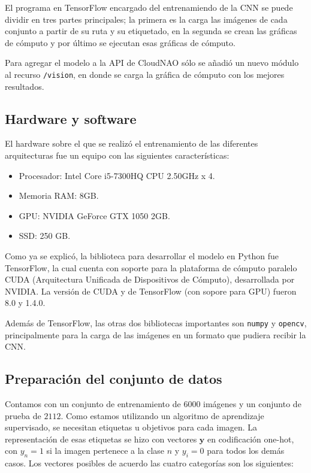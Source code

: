 El programa en TensorFlow encargado del entrenamiendo de la CNN se puede dividir en tres partes principales; la primera es la carga las imágenes de cada conjunto a partir de su ruta y su etiquetado, en la segunda
se crean las gráficas de cómputo y por último se ejecutan esas gráficas de cómputo.

Para agregar el modelo a la API de CloudNAO sólo se añadió un nuevo módulo
al recurso \texttt{/vision}, en donde se carga la gráfica de cómputo 
con los mejores resultados.
	

\subsection{Hardware y software}

El hardware sobre el que se realizó el entrenamiento de las
diferentes arquitecturas fue un equipo con las siguientes características:

\begin{itemize}

\item Procesador: Intel Core i5-7300HQ CPU 2.50GHz x 4.
\item Memoria RAM: 8GB.
\item GPU:  NVIDIA GeForce GTX 1050 2GB.
\item SSD: 250 GB.
\end{itemize}

Como ya se explicó, la biblioteca para desarrollar el modelo en Python fue TensorFlow, la cual cuenta
con soporte para la plataforma de cómputo paralelo CUDA (Arquitectura
Unificada de Dispositivos de Cómputo), desarrollada por NVIDIA.
La versión de CUDA y de TensorFlow (con sopore para GPU) fueron 8.0 y 1.4.0.

Además de TensorFlow, las otras dos bibliotecas importantes son 
\texttt{numpy} y \texttt{opencv}, principalmente para la carga de
las imágenes en un formato que pudiera recibir la CNN.

\subsection{Preparación del conjunto de datos}

Contamos con un conjunto de entrenamiento de $6000$ imágenes y 
un conjunto de prueba de $2112$.
Como estamos utilizando un algoritmo de aprendizaje supervisado, 
se necesitan etiquetas u objetivos para cada imagen. La representación
de esas etiquetas se hizo con vectores $\mathbf{y}$ en codificación one-hot,
con $y_n = 1$ si la imagen pertenece a la clase $n$ y $y_i = 0$ para todos los
demás casos. Los vectores posibles de acuerdo las cuatro categorías son los siguientes:

